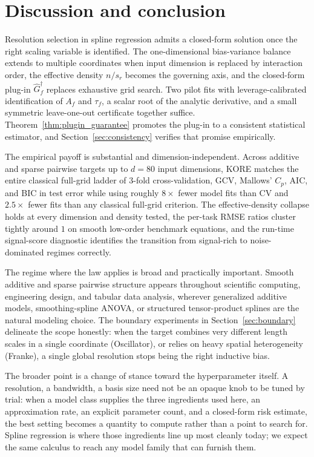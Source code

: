 \documentclass{article}
\newcommand{\KORE}{\textsc{KORE}}
\begin{document}
\section{Discussion and conclusion}
\label{sec:conclusion}

Resolution selection in spline regression admits a closed-form solution once the right scaling variable is identified. The one-dimensional bias-variance balance extends to multiple coordinates when input dimension is replaced by interaction order, the effective density $n / s_r$ becomes the governing axis, and the closed-form plug-in $\widehat{G}_f^\dagger$ replaces exhaustive grid search. Two pilot fits with leverage-calibrated identification of $A_f$ and $\tau_f$, a scalar root of the analytic derivative, and a small symmetric leave-one-out certificate together suffice. Theorem~\ref{thm:plugin_guarantee} promotes the plug-in to a consistent statistical estimator, and Section~\ref{sec:consistency} verifies that promise empirically.

The empirical payoff is substantial and dimension-independent. Across additive and sparse pairwise targets up to $d = 80$ input dimensions, \KORE{} matches the entire classical full-grid ladder of $3$-fold cross-validation, GCV, Mallows' $C_p$, AIC, and BIC in test error while using roughly $8\times$ fewer model fits than CV and $2.5\times$ fewer fits than any classical full-grid criterion. The effective-density collapse holds at every dimension and density tested, the per-task RMSE ratios cluster tightly around $1$ on smooth low-order benchmark equations, and the run-time signal-score diagnostic identifies the transition from signal-rich to noise-dominated regimes correctly.

The regime where the law applies is broad and practically important. Smooth additive and sparse pairwise structure appears throughout scientific computing, engineering design, and tabular data analysis, wherever generalized additive models, smoothing-spline ANOVA, or structured tensor-product splines are the natural modeling choice. The boundary experiments in Section~\ref{sec:boundary} delineate the scope honestly: when the target combines very different length scales in a single coordinate (Oscillator), or relies on heavy spatial heterogeneity (Franke), a single global resolution stops being the right inductive bias.

The broader point is a change of stance toward the hyperparameter itself. A resolution, a bandwidth, a basis size need not be an opaque knob to be tuned by trial: when a model class supplies the three ingredients used here, an approximation rate, an explicit parameter count, and a closed-form risk estimate, the best setting becomes a quantity to compute rather than a point to search for. Spline regression is where those ingredients line up most cleanly today; we expect the same calculus to reach any model family that can furnish them.
\end{document}
